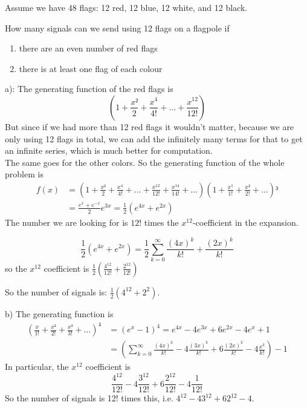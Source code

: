 \documentclass[english]{lbscript}
\begin{document}
\begin{example}{}{}
	Assume we have 48 flags: 12 red, 12 blue, 12 white, and 12 black.

	How many signals can we send using 12 flags on a flagpole if
	\begin{enumerate}[label=(\alph{*})]
		\item\label{item:16} there are an even number of red flags
		\item\label{item:17} there is at least one flag of each colour
	\end{enumerate}

	a): The generating function of the red flags is
	\begin{equation}
		\label{eq:47}
		\left(1+\frac{x²}{2} + \frac{x^{4}}{4!} + \dots + \frac{x^{12}}{12!} \right)
	\end{equation}
	But since if we had more than 12 red flags it wouldn't matter, because we are only using 12 flags in total, we can add the infinitely many terms for that to get an infinite series, which is much better for computation.\\
	The same goes for the other colors. So the generating function of the whole problem is
	\begin{align}
		\label{eq:48}
		f(x)
		 & = \left(1+\frac{x²}{2} + \frac{x^{4}}{4!} + \dots + \frac{x^{12}}{12!} + \frac{x^{14}}{14!}+\dots \right) \left(1 + \frac{x^{1}}{1!}+\frac{x²}{2!}+\dots \right)³ \\
		 & = \frac{e^{x}+e^{-x}}{2} e^{3x} = \frac{1}{2}\left(e^{4x}+e^{2x} \right)
	\end{align}
	The number we are looking for is \(12!\) times the \(x^{12}\)-coefficient in the expansion.

	\begin{equation}
		\label{eq:49}
		\frac{1}{2}(e^{4x}+e^{2x}) = \frac{1}{2} ∑_{k=0}^{∞} \frac{(4x)^{k}}{k!} + \frac{(2x)^{k}}{k!}
	\end{equation}
	so the \(x^{12}\) coefficient is \(\frac{1}{2}\left( \frac{4^{12}}{12!} + \frac{2^{12}}{12!}\right)\)

	So the number of signals is: \(\frac{1}{2} \left(4^{12}+2^{2} \right) \).

	b) The generating function is
	\begin{align}
		\label{eq:50}
		\left(\frac{x}{1!} + \frac{x²}{2!}+ \frac{x³}{3!} + \dots \right)^{4}
		 & = \left(e^{x}-1 \right)^{4} = e^{4x}-4e^{3x}+6e^{2x}-4e^{x}+1                                                            \\
		 & = \left(∑_{k=0}^{∞} \frac{(4x)^{k}}{k!} - 4 \frac{(3x)^{k}}{k!} + 6 \frac{(2x)^{k}}{k!} - 4 \frac{x^{k}}{k!} \right) - 1
	\end{align}
	In particular, the \(x^{12}\) coefficient is
	\begin{equation}
		\label{eq:51}
		\frac{4^{12}}{12!} - 4 \frac{3^{12}}{12!} + 6 \frac{2^{12}}{12!} - 4 \frac{1}{12!}
	\end{equation}
	So the number of signals is 12! times this, i.e. \(4^{12}-4 3^{12} + 6 2^{12} - 4\).
\end{example}
\end{document}
